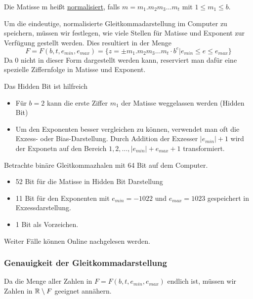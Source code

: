 \begin{definition}
Die Matisse m heißt \underline{normalisiert}, falls $m=m_1.m_2m_3 \ldots m_t$ mit $1\le m_1 \le b$.
\end{definition}
Um die eindeutige, normalisierte Gleitkommadarstellung im Computer zu speichern, müssen wir festlegen, wie viele Stellen für Matisse und Exponent zur Verfügung gestellt werden. Dies resultiert in der Menge 
\[
F=F(b,t,e_{min}, e_{max}) = \{z= \pm m_1.m_2m_3\ldots m_t \cdot b^{e} | e_{min} \le e \le e_{max} \} 
\]
Da 0 nicht in dieser Form dargestellt werden kann, reserviert man dafür eine spezielle Ziffernfolge in Matisse und Exponent.
\begin{remark}
Das Hidden Bit ist hilfreich
\begin{itemize}
	\item Für $b=2$ kann die erste Ziffer $m_1$ der Matisse weggelassen werden (Hidden Bit)
	\item Um den Exponenten besser vergleichen zu können, verwendet man oft die Exzess- oder Bias-Darstellung. Durch Addition der Exzesser $|e_{min}|+1$ wird der Exponetn auf den Bereich $1,2,\ldots, |e_{min}|+e_{max} +1 $ transformiert.
\end{itemize}
\end{remark}
\begin{example}
	Betrachte binäre Gleitkommazhalen mit 64 Bit auf dem Computer. 
	\begin{itemize}
		\item 52 Bit für die Matisse in Hidden Bit Darstellung
		\item 11 Bit für den Exponenten mit $e_{min} = -1022$ und $e_{max} =1023$ gespeichert in Exzessdarstellung.
		\item 1 Bit als Vorzeichen.
	\end{itemize}
Weiter Fälle können Online nachgelesen werden.
\end{example}

\subsubsection{Genauigkeit der Gleitkommadarstellung}
Da die Menge aller Zahlen in $F=F(b,t,e_{min},e_{max})$ endlich ist, müssen wir Zahlen in $\mathbb{R} \setminus  F$ geeignet annähern.

